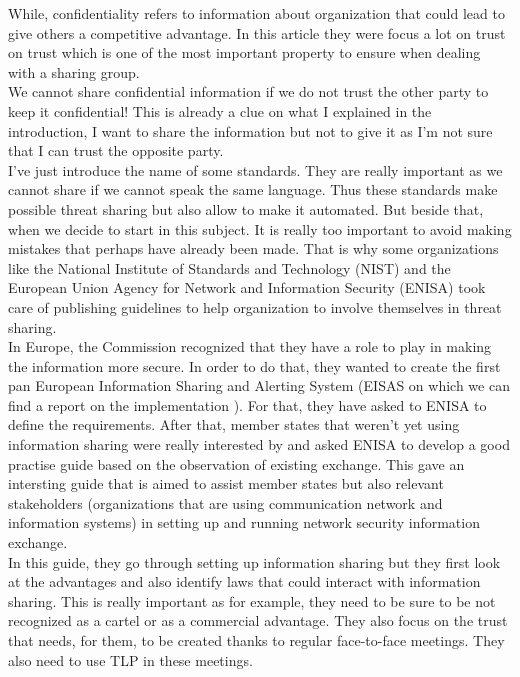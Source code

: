 \documentclass{eplmastersthesis}
\begin{document}
While, confidentiality refers to information about organization that could lead to give others a competitive advantage.
In this article they were focus a lot on trust on trust which is one of the most important property to ensure when dealing with a sharing group.\\
We cannot share confidential information if we do not trust the other party to keep it confidential! This is already a clue on what I explained in the introduction, I want to share the information but not to give it as I'm not sure that I can trust the opposite party.\\

I've just introduce the name of some standards. They are really important as we cannot share if we cannot speak the same language. Thus these standards make possible threat sharing but also allow to make it automated. But beside that, when we decide to start in this subject. It is really too important to avoid making mistakes that perhaps have already been made. That is why some organizations like the National Institute of Standards and Technology (NIST) and the European Union Agency for Network and Information Security (ENISA) took care of publishing guidelines to help organization to involve themselves in threat sharing.\\
In Europe, the Commission recognized that they have a role to play in making the information more secure. In order to do that, they wanted to create the first pan European Information Sharing and Alerting System (EISAS on which we can find a report on the implementation \cite{eisasRapport}). For that, they have asked to ENISA to define the requirements. After that, member states that weren't yet using information sharing were really interested by and asked ENISA to develop a good practise guide based on the observation of existing exchange. This gave an intersting guide \cite{enisaguide2009} that is aimed to assist member states but also relevant stakeholders (organizations that are using communication network and information systems) in setting up and running network security information exchange.\\
In this guide, they go through setting up information sharing but they first look at the advantages and also identify laws that could interact with information sharing. This is really important as for example, they need to be sure to be not recognized as a cartel or as a commercial advantage. They also focus on the trust that needs, for them, to be created thanks to regular face-to-face meetings. They also need to use TLP in these meetings.\\
\end{document}

